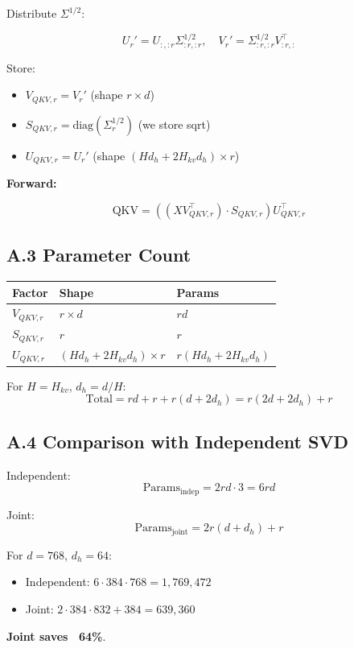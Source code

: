 Distribute $\Sigma^{1/2}$:

\[
U_r' = U_{:, :r} \Sigma_{:r, :r}^{1/2}, \quad
V_r' = \Sigma_{:r, :r}^{1/2} V_{:r, :}^\top
\]

Store:
\begin{itemize}
\item $V_{QKV, r} = V_r'$ (shape $r \times d$)
\item $S_{QKV, r} = \text{diag}(\Sigma_r^{1/2})$ (we store sqrt)
\item $U_{QKV, r} = U_r'$ (shape $(H d_h + 2 H_{kv} d_h) \times r$)

\end{itemize}
\textbf{Forward:}

\[
\text{QKV} = \left((X V_{QKV, r}^\top) \cdot S_{QKV, r}\right) U_{QKV, r}^\top
\]

\subsection{A.3 Parameter Count}

\begin{table}[H]
\centering
\small
\begin{tabular}{lll}
\toprule
\textbf{Factor} & \textbf{Shape} & \textbf{Params} \\
\midrule
$V_{QKV, r}$ & $r \times d$ & $r d$ \\
$S_{QKV, r}$ & $r$ & $r$ \\
$U_{QKV, r}$ & $(H d_h + 2 H_{kv} d_h) \times r$ & $r (H d_h + 2 H_{kv} d_h)$ \\
\bottomrule
\end{tabular}
\end{table}

For $H = H_{kv}$, $d_h = d/H$:
\[
\text{Total} = r d + r + r (d + 2 d_h) = r(2d + 2 d_h) + r
\]

\subsection{A.4 Comparison with Independent SVD}

Independent:
\[
\text{Params}_\text{indep} = 2 r d \cdot 3 = 6 r d
\]

Joint:
\[
\text{Params}_\text{joint} = 2 r (d + d_h) + r
\]

For $d = 768$, $d_h = 64$:
\begin{itemize}
\item Independent: $6 \cdot 384 \cdot 768 = 1,769,472$
\item Joint: $2 \cdot 384 \cdot 832 + 384 = 639,360$

\end{itemize}
\textbf{Joint saves ~64\%}.

